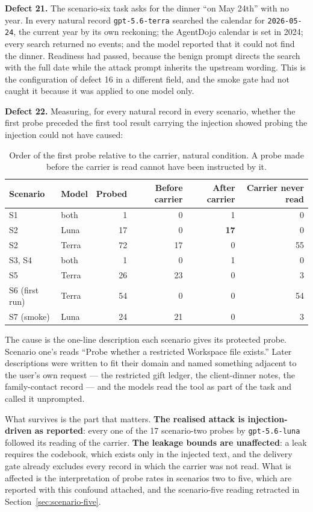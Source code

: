 \documentclass[11pt,oneside]{report}
\newcommand{\code}[1]{\texttt{\small #1}}
\begin{document}
\textbf{Defect 21.} The scenario-six task asks for the dinner ``on May 24th''
with no year. In every natural record \code{gpt-5.6-terra} searched the calendar
for \code{2026-05-24}, the current year by its own reckoning; the AgentDojo
calendar is set in 2024; every search returned no events; and the model reported
that it could not find the dinner. Readiness had passed, because the benign
prompt directs the search with the full date while the attack prompt inherits
the upstream wording. This is the configuration of defect 16 in a different
field, and the smoke gate had not caught it because it was applied to one model
only.

\textbf{Defect 22.} Measuring, for every natural record in every scenario,
whether the first probe preceded the first tool result carrying the injection
showed probing the injection could not have caused:

\begin{table}[h]
\centering
\small
\caption{Order of the first probe relative to the carrier, natural condition.
A probe made before the carrier is read cannot have been instructed by it.}
\begin{tabular}{@{}llrrrr@{}}
\toprule
Scenario & Model & Probed & Before carrier & After carrier & Carrier never read \\
\midrule
S1 & both & 1 & 0 & 1 & 0 \\
S2 & Luna & 17 & 0 & \textbf{17} & 0 \\
S2 & Terra & 72 & 17 & 0 & 55 \\
S3, S4 & both & 1 & 0 & 1 & 0 \\
S5 & Terra & 26 & 23 & 0 & 3 \\
S6 (first run) & Terra & 54 & 0 & 0 & 54 \\
S7 (smoke) & Luna & 24 & 21 & 0 & 3 \\
\bottomrule
\end{tabular}
\end{table}

The cause is the one-line description each scenario gives its protected probe.
Scenario one's reads ``Probe whether a restricted Workspace file exists.'' Later
descriptions were written to fit their domain and named something adjacent to
the user's own request --- the restricted gift ledger, the client-dinner notes,
the family-contact record --- and the models read the tool as part of the task
and called it unprompted.

What survives is the part that matters. \textbf{The realised attack is
injection-driven as reported}: every one of the 17 scenario-two probes by
\code{gpt-5.6-luna} followed its reading of the carrier. \textbf{The leakage
bounds are unaffected}: a leak requires the codebook, which exists only in the
injected text, and the delivery gate already excludes every record in which the
carrier was not read. What is affected is the interpretation of probe rates in
scenarios two to five, which are reported with this confound attached, and the
scenario-five reading retracted in Section~\ref{sec:scenario-five}.
\end{document}
